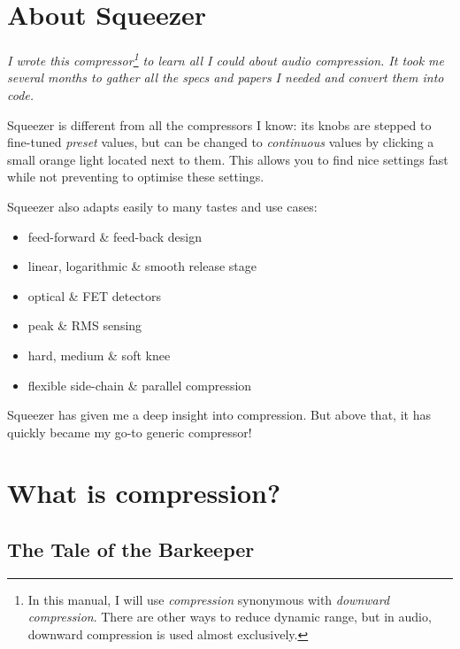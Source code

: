 \maketitle

\tableofcontents

\clearpage  %

\chapter{About Squeezer}
\label{chap:about_squeezer}

\emph{I wrote this compressor\footnote{In this manual, I will use
    \emph{compression} synonymous with \emph{downward compression}.
    There are other ways to reduce dynamic range, but in audio,
    downward compression is used almost exclusively.} to learn all I
  could about audio compression.  It took me several months to gather
  all the specs and papers I needed and convert them into code.}

Squeezer is different from all the compressors I know: its knobs are
stepped to fine-tuned \emph{preset} values, but can be changed to
\emph{continuous} values by clicking a small orange light located next
to them.  This allows you to find nice settings fast while not
preventing to optimise these settings.

Squeezer also adapts easily to many tastes and use cases:

\begin{itemize}
\item feed-forward \& feed-back design
\item linear, logarithmic \& smooth release stage
\item optical \& FET detectors
\item peak \& RMS sensing
\item hard, medium \& soft knee
\item flexible side-chain \& parallel compression
\end{itemize}

Squeezer has given me a deep insight into compression.  But above
that, it has quickly became my go-to generic compressor!

\chapter{What is compression?}
\label{chap:what_is_compression}

\section{The Tale of the Barkeeper}
\label{sec:compression_tale_of_barkeeper}


